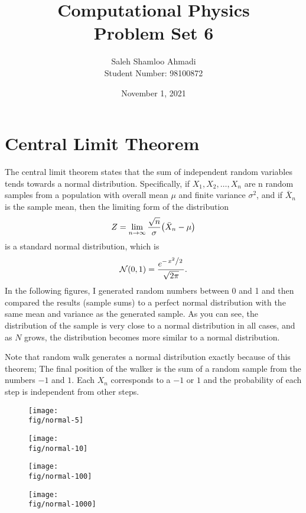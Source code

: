 \documentclass[12pt,a4paper]{article}
\title{Computational Physics\\Problem Set 6}
\author{Saleh Shamloo Ahmadi\\Student Number: 98100872}
\date{November 1, 2021}
\newcommand{\fig}{../fig}
\begin{document}
	\maketitle
    \section{Central Limit Theorem}
    The central limit theorem states that the sum of independent random variables tends towards a normal distribution.
    Specifically, if $X_1, X_2, \dots, X_n$ are n random samples from a population with overall mean $\mu$ and finite
    variance $\sigma ^{2}$, and if $\bar{X}_{n}$ is the sample mean, then the limiting form of the distribution
    \begin{equation}
        Z=\lim _{n\to\infty}\frac{\sqrt{n}}{\sigma}\qty(\bar{X}_{n}-\mu)
    \end{equation}
    is a standard normal distribution, which is
    \begin{equation}
        \mathcal{N}(0, 1) = \frac{e^{-\flatfrac{x^2}{2}}}{\sqrt{2\pi}}.
    \end{equation}
    In the following figures, I generated random numbers between 0 and 1 and then compared the results (sample sums)
    to a perfect normal distribution with the same mean and variance as the generated sample.
    As you can see, the distribution of the sample is very close to a normal distribution in all
    cases, and as $N$ grows, the distribution becomes more similar to a normal distribution.

    Note that random walk generates a normal distribution exactly because of this theorem; The final position of the
    walker is the sum of a random sample from the numbers $-1$ and $1$. Each $X_n$ corresponds to a $-1$ or $1$ and
    the probability of each step is independent from other steps.
    \begin{figure}
        \centering
        \texttt{[image: \\fig/normal-5]}
    \end{figure}
    \begin{figure}
        \centering
        \texttt{[image: \\fig/normal-10]}
    \end{figure}
    \begin{figure}
        \centering
        \texttt{[image: \\fig/normal-100]}
    \end{figure}
    \begin{figure}
        \centering
        \texttt{[image: \\fig/normal-1000]}
    \end{figure}
\end{document}
